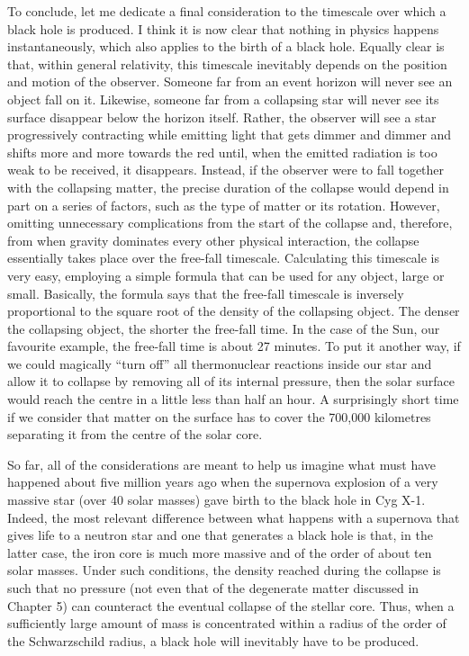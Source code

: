 To conclude, let me dedicate a final consideration to the timescale over which a black
hole is produced. I think it is now clear that nothing in physics happens
instantaneously, which also applies to the birth of a black hole. Equally clear is that,
within general relativity, this timescale inevitably depends on the position and motion
of the observer. Someone far from an event horizon will never see an object fall on it.
Likewise, someone far from a collapsing star will never see its surface disappear below
the horizon itself. Rather, the observer will see a star progressively contracting while
emitting light that gets dimmer and dimmer and shifts more and more towards the red
until, when the emitted radiation is too weak to be received, it disappears. Instead, if
the observer were to fall together with the collapsing matter, the precise duration of
the collapse would depend in part on a series of factors, such as the
type of matter or its rotation. However, omitting unnecessary complications from the
start of the collapse and, therefore, from when gravity dominates every other physical
interaction, the collapse essentially takes place over the free-fall
timescale. Calculating this timescale is very easy, employing a simple formula that can
be used for any object, large or small. Basically, the formula says that the free-fall
timescale is inversely proportional to the square root of the density of the collapsing
object. The denser the collapsing object, the shorter the free-fall time. In the case of
the Sun, our favourite example, the free-fall time is about 27 minutes. To put it
another way, if we could magically ``turn off'' all thermonuclear reactions inside our
star and allow it to collapse by removing all of its internal pressure, then the solar
surface would reach the centre in a little less than half an hour. A surprisingly short
time if we consider that matter on the surface has to cover the 700,000 kilometres
separating it from the centre of the solar core.

So far, all of the considerations are meant to help us imagine what must have happened
about five million years ago when the supernova explosion of a very
massive star (over 40 solar masses) gave birth to the black hole in Cyg
X-1. Indeed, the most relevant difference between what happens with a
supernova that gives life to a neutron star and one that generates a black hole is that,
in the latter case, the iron core is much more massive and of the
order of about ten solar masses. Under such conditions, the density reached during the
collapse is such that no pressure (not even that of the degenerate
matter discussed in Chapter 5) can counteract the eventual collapse of the stellar core.
Thus, when a sufficiently large amount of mass is concentrated within a radius of the
order of the Schwarzschild radius, a black hole will inevitably have to be produced.

